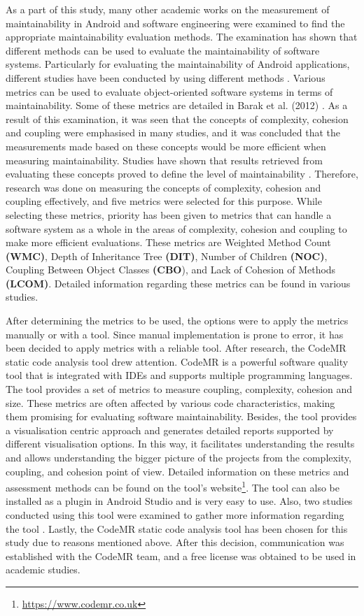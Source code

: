 As a part of this study, many other academic works on the measurement of maintainability in Android and software engineering were examined to find the appropriate maintainability evaluation methods. The examination has shown that different methods can be used to evaluate the maintainability of software systems. Particularly for evaluating the maintainability of Android applications, different studies have been conducted by using different methods \cite{34} \cite{43}. Various metrics can be used to evaluate object-oriented software systems in terms of maintainability. Some of these metrics are detailed in Barak et al. (2012) \cite{33}. As a result of this examination, it was seen that the concepts of complexity, cohesion and coupling were emphasised in many studies, and it was concluded that the measurements made based on these concepts would be more efficient when measuring maintainability. Studies have shown that results retrieved from evaluating these concepts proved to define the level of maintainability \cite{33}. Therefore, research was done on measuring the concepts of complexity, cohesion and coupling effectively, and five metrics were selected for this purpose. While selecting these metrics, priority has been given to metrics that can handle a software system as a whole in the areas of complexity, cohesion and coupling to make more efficient evaluations. These metrics are Weighted Method Count \textbf{(WMC)}, Depth of Inheritance Tree \textbf{(DIT)}, Number of Children \textbf{(NOC)}, Coupling Between Object Classes \textbf{(CBO}), and Lack of Cohesion of Methods \textbf{(LCOM)}. Detailed information regarding these metrics can be found in various studies\cite{33,34,35,36}.

After determining the metrics to be used, the options were to apply the metrics manually or with a tool. Since manual implementation is prone to error, it has been decided to apply metrics with a reliable tool. After research, the CodeMR static code analysis tool drew attention. CodeMR is a powerful software quality tool that is integrated with IDEs and supports multiple programming languages. The tool provides a set of metrics to measure coupling, complexity, cohesion and size. These metrics are often affected by various code characteristics, making them promising for evaluating software maintainability. Besides, the tool provides a visualisation centric approach and generates detailed reports supported by different visualisation options. In this way, it facilitates understanding the results and allows understanding the bigger picture of the projects from the complexity, coupling, and cohesion point of view. Detailed information on these metrics and assessment methods can be found on the tool's website\footnote{\url{https://www.codemr.co.uk}}. The tool can also be installed as a plugin in Android Studio and is very easy to use. Also, two studies conducted using this tool were examined to gather more information regarding the tool \cite{38,39}. Lastly, the CodeMR static code analysis tool has been chosen for this study due to reasons mentioned above. After this decision, communication was established with the CodeMR team, and a free license was obtained to be used in academic studies. 

